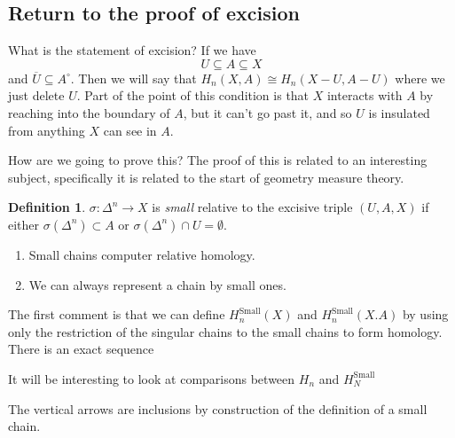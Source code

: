 \documentclass[12pt]{article}
\theoremstyle{definition}
\newtheorem{definition}[theorem]{Definition}
\begin{document}
	\subsection{Return to the proof of excision}
	What is the statement of excision?
	If we have \[
	U\subseteq A \subseteq X
	\] 
	and $\overline{U}\subseteq A^\circ$. Then we will say that $H_n(X,A)\cong H_n(X-U,A-U)$ where we just delete $U$. Part of the point of this condition is that $X$ interacts with $A$ by reaching into the boundary of $A$, but it can't go past it, and so $U$ is insulated from anything $X$ can see in $A$.
	
	How are we going to prove this? The proof of this is related to an interesting subject, specifically it is related to the start of geometry measure theory.
	\begin{definition}
		$\sigma:\Delta^n\to X$ is \textit{small} relative to the excisive triple $(U,A,X)$ if either $\sigma(\Delta^n)\subset A$ or $\sigma(\Delta^n)\cap U=\emptyset$. 
	\end{definition}
	\begin{enumerate}
		\item Small chains computer relative homology.
		\item We can always represent a chain by small ones. 
	\end{enumerate}
	The first comment is that we can define $H_n^{\text{Small}}(X)$ and $H_n^{\text{Small}}(X.A)$ by using only the restriction of the singular chains to the small chains to form homology. There is an exact sequence \begin{center}
	\end{center}
	It will be interesting to look at comparisons between $H_n$ and $H_N^{\text{Small}}$
	\begin{center}
	\end{center}
	The vertical arrows are inclusions by construction of the definition of a small chain.
	
\end{document}
